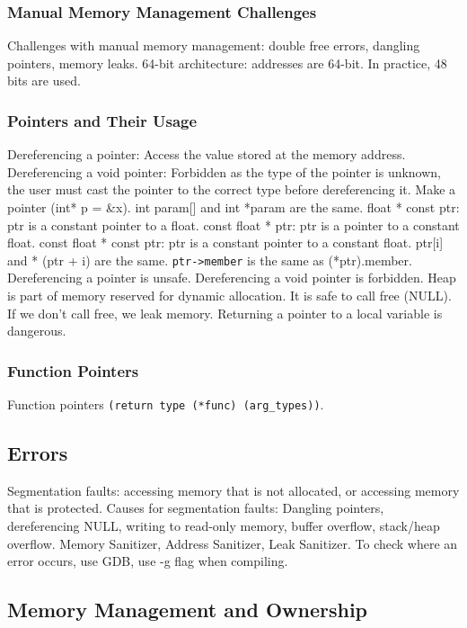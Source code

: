 \documentclass{article}
\begin{document}
\subsubsection*{Manual Memory Management Challenges}
Challenges with manual memory management: double free errors, dangling pointers, memory leaks.
64-bit architecture: addresses are 64-bit. In practice, 48 bits are used.

\subsubsection*{Pointers and Their Usage}
Dereferencing a pointer: Access the value stored at the memory address.
Dereferencing a void pointer: Forbidden as the type of the pointer is unknown, the user must cast the pointer
to the correct type before dereferencing it.
Make a pointer (int* p = \&x).
int param[] and int *param are the same.
float * const ptr: ptr is a constant pointer to a float.
const float * ptr: ptr is a pointer to a constant float.
const float * const ptr: ptr is a constant pointer to a constant float.
ptr[i] and * (ptr + i) are the same.
\texttt{ptr->member} is the same as (*ptr).member.
Dereferencing a pointer is unsafe.
Dereferencing a void pointer is forbidden.
Heap is part of memory reserved for dynamic allocation.
It is safe to call free (NULL).
If we don't call free, we leak memory.
Returning a pointer to a local variable is dangerous.

\subsubsection*{Function Pointers}
Function pointers \texttt{(return type (*func) (arg\_types))}.

\subsection*{Errors}

Segmentation faults: accessing memory that is not allocated, or accessing memory that is protected.
Causes for segmentation faults: Dangling pointers, dereferencing NULL, writing to read-only memory,
buffer overflow, stack/heap overflow.
Memory Sanitizer, Address Sanitizer, Leak Sanitizer.
To check where an error occurs, use GDB, use -g flag when compiling.

\subsection*{Memory Management and Ownership}
\end{document}
